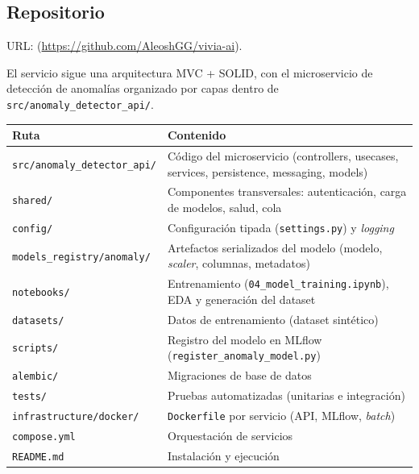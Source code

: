 

\subsection{Repositorio}

URL: \ReporteRepositorio{} (\url{https://github.com/AleoshGG/vivia-ai}).

El servicio sigue una arquitectura MVC + SOLID, con el microservicio de detección
de anomalías organizado por capas dentro de \texttt{src/anomaly\_detector\_api/}.

\begin{tabular}{@{}lp{9.5cm}@{}}
  \toprule
  Ruta & Contenido \\
  \midrule
  \texttt{src/anomaly\_detector\_api/} & Código del microservicio (controllers, usecases, services, persistence, messaging, models) \\
  \texttt{shared/} & Componentes transversales: autenticación, carga de modelos, salud, cola \\
  \texttt{config/} & Configuración tipada (\texttt{settings.py}) y \textit{logging} \\
  \texttt{models\_registry/anomaly/} & Artefactos serializados del modelo (modelo, \textit{scaler}, columnas, metadatos) \\
  \texttt{notebooks/} & Entrenamiento (\texttt{04\_model\_training.ipynb}), EDA y generación del dataset \\
  \texttt{datasets/} & Datos de entrenamiento (dataset sintético) \\
  \texttt{scripts/} & Registro del modelo en MLflow (\texttt{register\_anomaly\_model.py}) \\
  \texttt{alembic/} & Migraciones de base de datos \\
  \texttt{tests/} & Pruebas automatizadas (unitarias e integración) \\
  \texttt{infrastructure/docker/} & \texttt{Dockerfile} por servicio (API, MLflow, \textit{batch}) \\
  \texttt{compose.yml} & Orquestación de servicios \\
  \texttt{README.md} & Instalación y ejecución \\
  \bottomrule
\end{tabular}

